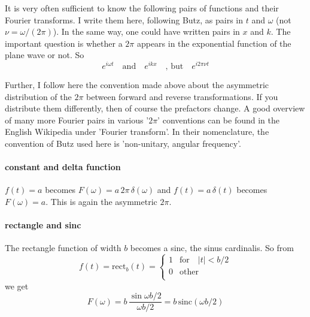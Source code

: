 It is very often sufficient to know the following pairs of functions and their Fourier transforms. I write them here, following Butz, as pairs in $t$ and $\omega$ (not $\nu = \omega / (2 \pi)$). In the same way, one could have written pairs in $x$ and $k$. The important question is whether a $2 \pi$ appears in the exponential function of the plane wave or not. So
\begin{equation}
e^{i \omega t} \quad \text{and} \quad e^{i k x} \quad \text{, but} \quad 
e^{i 2 \pi \nu t}
\end{equation}

Further, I follow here the convention made above about the asymmetric distribution of the $2 \pi$ between forward and reverse transformations. If you distribute them differently, then of course the prefactors change. A good overview of many more Fourier pairs in various '$2 \pi$' conventions can be found in the English Wikipedia under 'Fourier transform'. In their nomenclature, the convention of Butz used here is 'non-unitary, angular frequency'.

\paragraph{constant and delta function} $f(t) = a$ becomes $F(\omega) = a \, 2 \pi \, \delta(\omega)$ and $f(t) = a \, \delta(t)$ becomes $F(\omega) = a $. This is again the asymmetric $2 \pi$.


\paragraph{rectangle and sinc} The rectangle function of width $b$ becomes a sinc, the sinus cardinalis. So from
\begin{equation}
 f(t) = \text{rect} _b (t) = \left\{ 
 \begin{array}{ll}
 1 & \text{for} \quad |t| < b/2 \\
 0 & \text{other} \\
 \end{array}
 \right.
\end{equation}
we get
\begin{equation}
F(\omega) = b \, \frac{\sin \omega b / 2}{\omega b /2} = b \, \text{sinc}( \omega b /2)
\end{equation}



